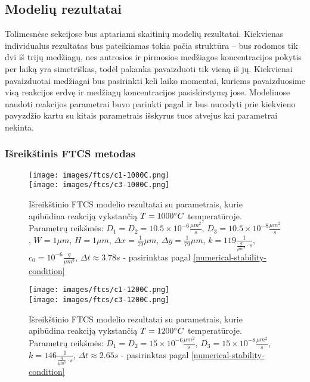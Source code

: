 \subsection{Modelių rezultatai}

Tolimesnėse sekcijose bus aptariami skaitinių modelių rezultatai. Kiekvienas individualus rezultatas bus pateikiamas tokia pačia struktūra -- bus rodomos tik dvi iš trijų medžiagų, nes antrosios ir pirmosios medžiagos koncentracijos pokytis per laiką yra simetriškas, todėl pakanka pavaizduoti tik vieną iš jų. Kiekvienai pavaizduotai medžiagai bus pasirinkti keli laiko momentai, kuriems pavaizduosime visą reakcijos erdvę ir medžiagų koncentracijos pasiskirstymą jose. Modeliuose naudoti reakcijos parametrai buvo parinkti pagal \cite{mackeviciusCloserLookComputer2012} ir bus nurodyti prie kiekvieno pavyzdžio kartu su kitais parametrais išskyrus tuos atvejus kai parametrai nekinta.

\subsubsection{Išreikštinis FTCS metodas}

\begin{figure}[h!]
  \centering
  \texttt{[image: images/ftcs/c1-1000C.png]} \\ 
  \texttt{[image: images/ftcs/c3-1000C.png]}
  \caption{Išreikštinio FTCS modelio rezultatai su parametrais, kurie apibūdina reakciją vykstančią $T=1000\degree C$ temperatūroje. Parametrų reikšmės: $D_1 = D_2 = 10.5\times 10^{-6} \frac{\mu m^2}{s}$, $D_3 = 10.5\times 10^{-8} \frac{\mu m^2}{s}$, $W = 1\mu m$, $H = 1\mu m$, $\Delta x = \frac{1}{79}\mu m$, $\Delta y = \frac{1}{79} \mu m$, $k = 119 \frac{1}{ \frac{g}{\mu m^3}\cdot s}$, $c_0 = 10^{-6} \frac{g}{\mu m^3}$, $\Delta t \approx 3.78s$ - pasirinktas pagal \eqref{numerical-stability-condition} }
  \label{fig:ftcs-result-T-1000}
\end{figure}

\begin{figure}[h!]
  \centering
  \texttt{[image: images/ftcs/c1-1200C.png]} \\ 
  \texttt{[image: images/ftcs/c3-1200C.png]}
  \caption{Išreikštinio FTCS modelio rezultatai su parametrais, kurie apibūdina reakciją vykstančią $T=1200\degree C$ temperatūroje. Parametrų reikšmės: $D_1 = D_2 = 15\times 10^{-6} \frac{\mu m^2}{s}$, $D_3 = 15\times 10^{-8} \frac{\mu m^2}{s}$, $k = 146 \frac{1}{ \frac{g}{\mu m^3}\cdot s}$, $\Delta t \approx 2.65s$ - pasirinktas pagal \eqref{numerical-stability-condition} }
  \label{fig:ftcs-result-T-1200}
\end{figure}

